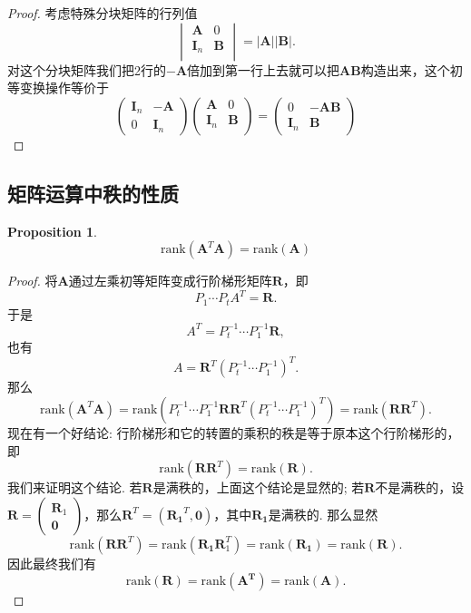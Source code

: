 \documentclass{article}
\newtheorem{proposition}[theorem]{Proposition}
\newcommand{\mbf}[1]{\bm{#1}}
\newcommand{\rank}[1]{\text{rank}\left(#1\right)} %
\begin{document}
\begin{proof}
考虑特殊分块矩阵的行列值
$$
\begin{vmatrix}
\mbf{A} & 0 \\
\mbf{I}_n & \mbf{B} \\
\end{vmatrix} = |\mbf{A}||\mbf{B}|.
$$
对这个分块矩阵我们把2行的$-\mbf{A}$倍加到第一行上去就可以把$\mbf{A}\mbf{B}$构造出来，这个初等变换操作等价于
$$
\begin{pmatrix}
\mbf{I}_n & -\mbf{A} \\
0 & \mbf{I}_n
\end{pmatrix}
\begin{pmatrix}
\mbf{A} & 0 \\
\mbf{I}_n & \mbf{B} \\
\end{pmatrix} = 
\begin{pmatrix}
0 & -\mbf{A}\mbf{B} \\
\mbf{I}_n & \mbf{B} 
\end{pmatrix}
$$
\end{proof}

\newpage
\subsection{矩阵运算中秩的性质}

\begin{proposition}\label{rank-of-matrix-multiplication: transpose}
\rm 
$$
\rank{\mbf{A}^T\mbf{A}} = \rank{\mbf{A}}
$$
\end{proposition}

\begin{proof}
将$\mbf{A}$通过左乘初等矩阵变成行阶梯形矩阵$\mbf{R}$，即
$$
P_1\cdots P_t A^T = \mbf{R}.
$$
于是
$$
A^T = P_t^{-1}\cdots P_1^{-1}\mbf{R},
$$
也有
$$
A = \mbf{R}^T(P_t^{-1}\cdots P_1^{-1})^T.
$$
那么
$$
\rank{\mbf{A}^T\mbf{A}} = \rank{P_t^{-1}\cdots P_1^{-1}\mbf{R}\mbf{R}^T(P_t^{-1}\cdots P_1^{-1})^T} = \rank{\mbf{R}\mbf{R}^T}. 
$$
现在有一个好结论: 行阶梯形和它的转置的乘积的秩是等于原本这个行阶梯形的，即
$$
\rank{\mbf{R}\mbf{R}^T} = \rank{\mbf{R}}.
$$
我们来证明这个结论. 若$\mbf{R}$是满秩的，上面这个结论是显然的; 若$\mbf{R}$不是满秩的，设$\mbf{R} = \begin{pmatrix}
\mbf{R}_1 \\
\mbf{0} 
\end{pmatrix}$，那么$\mbf{R}^T = (\mbf{R_1}^T, \mbf{0})$，其中$\mbf{R_1}$是满秩的. 那么显然
$$
\rank{\mbf{R}\mbf{R}^T} = \rank{\mbf{R_1}\mbf{R}_1^T} = \rank{\mbf{R_1}} = \rank{\mbf{R}}.
$$
因此最终我们有
$$
\rank{\mbf{R}} = \rank{\mbf{A^T}} = \rank{\mbf{A}}.
$$
\end{proof}
\end{document}
